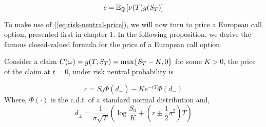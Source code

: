 \documentclass[../TGMAFFIRO.tex]{subfiles}
\begin{document}
\begin{equation}\label{eq:risk-neutral-expectation}
  c = \mathbb{E}_{\mathbb{Q}}\left[\nu(T)g(S_T)\right]
\end{equation}

To make use of (\ref{eq:risk-neutral-price}), we will now turn to price a European call option, presented first in chapter 1. In the following proposition, we derive the famous closed-valued formula for the price of a European call option.

\begin{proposition}
	Consider a claim $C(\omega) = g(T, S_T) = \max\{S_T - K, 0\}$ for some $K > 0$, the price of the claim at $t=0$, under risk neutral probability is
	
	\begin{equation} \label{eq:risk-neutral-price}
		c = S_0 \Phi(d_+) - Ke^{-rT}\Phi(d_-)
	\end{equation}
	Where,
	$\Phi(\cdot)$ is the c.d.f. of a standard normal distribution and,
	\[
		d_\pm = \frac{1}{\sigma\sqrt{T}}\left(\log\frac{S_0}{K} + (r \pm \frac{1}{2}\sigma^2)
		T\right)
	\]
\end{proposition}
\end{document}
